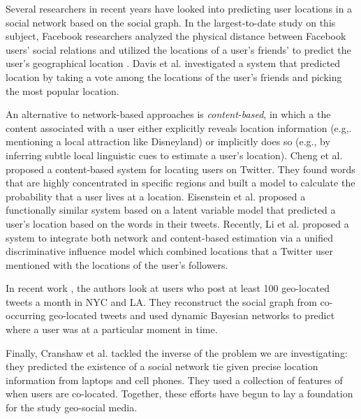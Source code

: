 Several researchers in recent years have looked into predicting user locations
in a social network based on the social graph.
%
In the largest-to-date study on this subject, Facebook researchers analyzed the
physical distance between Facebook users' social relations and utilized the
locations of a user's friends' to predict the user's geographical location
\cite{backstrom2010find}.
%
Davis et al. \cite{davis2011infer} investigated a system that predicted
location by taking a vote among the locations of the user's friends and picking
the most popular location.

An alternative to network-based approaches is \textit{content-based}, in which
a the content associated with a user either explicitly reveals location
information (e.g,. mentioning a local attraction like Disneyland) or implicitly
does so (e.g., by inferring subtle local linguistic cues to estimate a user's
location).
%
Cheng et al. \cite{cheng2010you} proposed a content-based system for locating
users on Twitter.
%
They found words that are highly concentrated in specific regions and built a
model to calculate the probability that a user lives at a location.
%
Eisenstein et al. \cite{eisenstein2010latent} proposed a functionally similar
system based on a latent variable model that predicted a user's location based
on the words in their tweets.
%
Recently, Li et al. \cite{li2012towards} proposed a system to integrate both
network and content-based estimation via a unified discriminative influence
model which combined locations that a Twitter user mentioned with the locations
of the user's followers.

In recent work \cite{sadilek2012finding}, the authors look at users who post at
least 100 geo-located tweets a month in NYC and LA.
%
They reconstruct the social graph from co-occurring geo-located tweets and used
dynamic Bayesian networks to predict where a user was at a particular moment in
time.

Finally, Cranshaw et al. \cite{cranshaw2010bridging} tackled the inverse of the
problem we are investigating: they predicted the existence of a social network
tie given precise location information from laptops and cell phones.
%
They used a collection of features of when users are co-located.
%
Together, these efforts have begun to lay a foundation for the study geo-social media.

